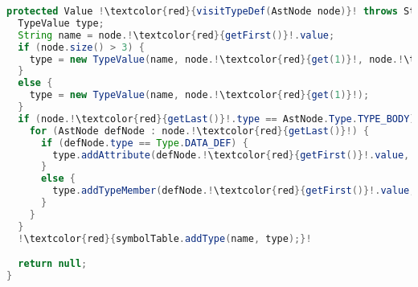 \begin{lstlisting}[language=Java,escapechar=!]
protected Value !\textcolor{red}{visitTypeDef(AstNode node)}! throws StandardError {
  TypeValue type;
  String name = node.!\textcolor{red}{getFirst()}!.value;
  if (node.size() > 3) {
    type = new TypeValue(name, node.!\textcolor{red}{get(1)}!, node.!\textcolor{red}{get(2)}!.value, !\textcolor{red}{node.get(3)}!);
  }
  else {
    type = new TypeValue(name, node.!\textcolor{red}{get(1)}!);
  }
  if (node.!\textcolor{red}{getLast()}!.type == AstNode.Type.TYPE_BODY) {
    for (AstNode defNode : node.!\textcolor{red}{getLast()}!) {
      if (defNode.type == Type.DATA_DEF) {
        type.addAttribute(defNode.!\textcolor{red}{getFirst()}!.value, new Member(defNode));
      }
      else {
        type.addTypeMember(defNode.!\textcolor{red}{getFirst()}!.value, new Member(defNode));
      }
    }
  }
  !\textcolor{red}{symbolTable.addType(name, type);}!

  return null;
}
\end{lstlisting}
